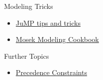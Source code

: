 \begin{resource}
Modeling Tricks
\begin{itemize}
\item \href{https://jump.dev/JuMP.jl/stable/tutorials/linear/tips_and_tricks/}{JuMP tips and tricks}
\item \href{https://docs.mosek.com/modeling-cookbook/mio.html}{Mosek Modeling Cookbook}
\end{itemize}


{Further Topics}
\begin{itemize}
\item \href{https://or.stackexchange.com/questions/1319/best-model-for-precedence-constraints-within-scheduling-problem}{Precedence Constraints}
\end{itemize}
\end{resource}

%
